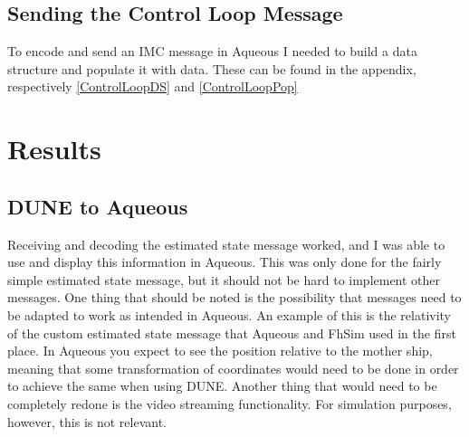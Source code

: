 \documentclass{article}
\begin{document}
\subsection{Sending the Control Loop Message}
To encode and send an IMC message in Aqueous I needed to build a data structure and populate it with data.
These can be found in the appendix, respectively \autoref{ControlLoopDS} and \autoref{ControlLoopPop}





\section{Results}\label{res}
\subsection{DUNE to Aqueous}
Receiving and decoding the estimated state message worked, and I was able to use and display this information in Aqueous.
This was only done for the fairly simple estimated state message, but it should not be hard to implement other messages.
One thing that should be noted is the possibility that messages need to be adapted to work as intended in Aqueous.
An example of this is the relativity of the custom estimated state message that Aqueous and FhSim used in the first place.
In Aqueous you expect to see the position relative to the mother ship, 
meaning that some transformation of coordinates would need to be done in order to achieve the same when using DUNE.
Another thing that would need to be completely redone is the video streaming functionality. For simulation purposes, however, this is not relevant.
\end{document}
